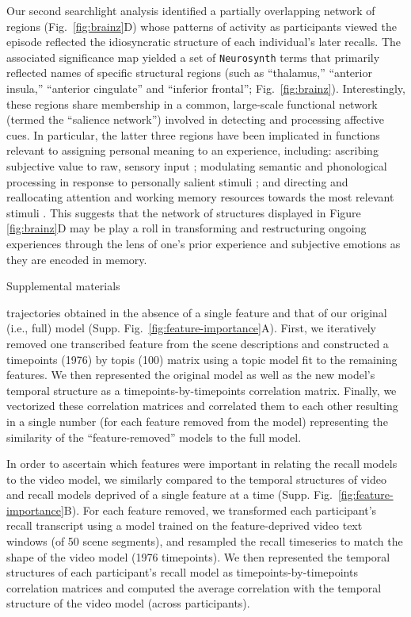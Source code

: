 Our second searchlight analysis identified a partially overlapping network of regions (Fig.~\ref{fig:brainz}D) whose patterns of activity as participants viewed the episode reflected the idiosyncratic structure of each individual's later recalls.  The associated significance map yielded a set of \texttt{Neurosynth} terms that primarily reflected names of specific structural regions (such as ``thalamus,'' ``anterior insula,'' ``anterior cingulate'' and ``inferior frontal''; Fig.~\ref{fig:brainz}).  Interestingly, these regions share membership in a common, large-scale functional network (termed the ``salience network'') involved in detecting and processing affective cues.  In particular, the latter three regions have been implicated in functions relevant to assigning personal meaning to an experience, including: ascribing subjective value to raw, sensory input \citep{MedfCrit10}; modulating semantic and phonological processing in response to personally salient stimuli \citep{KellEtal07b}; and directing and reallocating attention and working memory resources towards the most relevant stimuli \citep{MenoUddi10}.  This suggests that the network of structures displayed in Figure \ref{fig:brainz}D may be play a roll in transforming and restructuring ongoing experiences through the lens of one's prior experience and subjective emotions as they are encoded in memory.



%


Supplemental materials



trajectories obtained in the absence of a single feature and that of our original (i.e., full) model (Supp. Fig.~\ref{fig:feature-importance}A). First, we iteratively removed one transcribed feature from the scene descriptions and constructed a timepoints (1976) by topis (100) matrix using a topic model fit to the remaining features. We then represented the original model as well as the new model’s temporal structure as a timepoints-by-timepoints correlation matrix. Finally, we vectorized these correlation matrices and correlated them to each other resulting in a single number (for each feature removed from the model) representing the similarity of the ``feature-removed'' models to the full model.

In order to ascertain which features were important in relating the recall models to the video model, we similarly compared to the temporal structures of video and recall models deprived of a single feature at a time (Supp. Fig.~\ref{fig:feature-importance}B). For each feature removed, we transformed each participant’s recall transcript using a model trained on the feature-deprived video text windows (of 50 scene segments), and resampled the recall timeseries to match the shape of the video model (1976 timepoints). We then represented the temporal structures of each participant’s recall model as timepoints-by-timepoints correlation matrices and computed the average correlation with the temporal structure of the video model (across participants).





